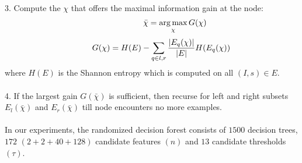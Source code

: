 \documentclass[twocolumn]{svjour3}          %
\begin{document}
3. Compute the $\chi$ that offers the maximal information gain at the node:
\begin{equation}
\hspace{20mm} \bar{\chi} = \operatorname*{arg\,max}_\chi G(\chi)
\end{equation}
\begin{equation}
\hspace{8mm} G(\chi) = H(E) - \sum_{q \in {l, r}}{\frac{|E_{q}(\chi)|}{|E|}H(E_{q}(\chi))}
\end{equation}
where $H(E)$ is the Shannon entropy which is computed on all $(I, s) \in E$.\\\vspace{-2.5mm}\\
4. If the largest gain $G(\bar{\chi})$ is sufficient, then recurse for left and right subsets $E_{l}(\bar{\chi})$ and $E_{r}(\bar{\chi})$ till node encounters no more examples.\\\vspace{-2.5mm}\\
In our experiments, the randomized decision forest consists of $1500$ decision trees, $172$ $(2+2+40+128)$ candidate features $(n)$ and $13$ candidate thresholds $(\tau)$.  
\end{document}
